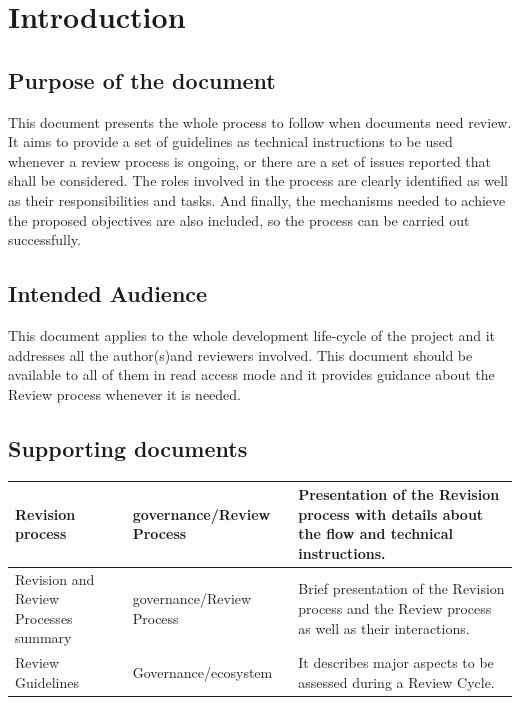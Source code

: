 \documentclass{template/openetcs_article}
\begin{document}
\newpage

\section{Introduction}

\subsection[Introduction]{Purpose of the document}
This document presents the whole process to follow when documents need review. It aims to provide a set of guidelines as technical instructions to be used whenever a review process is ongoing, or there are a set of issues reported that shall be considered. The roles involved in the process are clearly identified as well as their responsibilities and tasks. And finally, the mechanisms needed to achieve the proposed objectives are also included, so the process can be carried out successfully.

\subsection{Intended Audience}
This document applies to the whole development life-cycle of the project and it addresses all the author(s)and reviewers involved. This document should be available to all of them in read access mode and it provides guidance about the Review process whenever it is needed. 

\subsection{Supporting documents}
\tablehead{}
\tabletail{}
\tablelasttail{}
\begin{supertabular}{|m{2cm}m{3cm}m{9cm}|}
\hline
Revision process &
governance/Review Process &
Presentation of the Revision process with details about the flow and technical instructions.
\\\hline
Revision and Review Processes summary &
governance/Review Process &
Brief presentation of the Revision process and the Review process as well as their interactions.
\\\hline
Review Guidelines &
Governance/ecosystem &
It describes major aspects to be assessed during a Review Cycle.
\\\hline
\end{supertabular}
\end{document}
